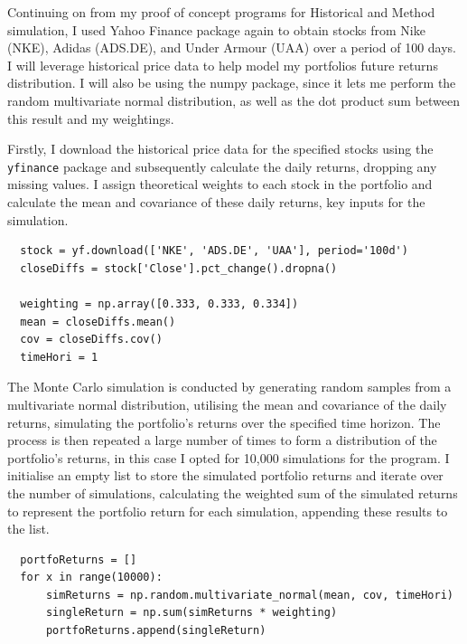 \documentclass{article}
\begin{document}
Continuing on from my proof of concept programs for Historical and Method simulation, I used Yahoo Finance package again to obtain stocks from Nike (NKE), Adidas (ADS.DE), and Under Armour (UAA) over a period of 100 days. I will leverage historical price data to help model my portfolios future returns distribution. I will also be using the numpy package, since it lets me perform the random multivariate normal distribution, as well as the dot product sum between this result and my weightings. \\\vspace{0.3cm}


Firstly, I download the historical price data for the specified stocks using the \texttt{yfinance} package and subsequently  calculate the daily returns, dropping any missing values. I assign theoretical weights to each stock in the portfolio and calculate the mean and covariance of these daily returns, key inputs for the simulation.\\\vspace{0.3cm}

\begin{verbatim}
  stock = yf.download(['NKE', 'ADS.DE', 'UAA'], period='100d')
  closeDiffs = stock['Close'].pct_change().dropna()

  weighting = np.array([0.333, 0.333, 0.334])
  mean = closeDiffs.mean()
  cov = closeDiffs.cov()
  timeHori = 1
\end{verbatim}

\vspace{0.3cm}
The Monte Carlo simulation is conducted by generating random samples from a multivariate normal distribution, utilising the mean and covariance of the daily returns, simulating the portfolio's returns over the specified time horizon. The process is then repeated a large number of times to form a distribution of the portfolio's returns, in this case I opted for 10,000 simulations for the program. I initialise an empty list to store the simulated portfolio returns and iterate over the number of simulations, calculating the weighted sum of the simulated returns to represent the portfolio return for each simulation, appending these results to the list.\\\vspace{0.3cm}

\begin{verbatim}
  portfoReturns = []
  for x in range(10000):
      simReturns = np.random.multivariate_normal(mean, cov, timeHori)
      singleReturn = np.sum(simReturns * weighting)
      portfoReturns.append(singleReturn)
\end{verbatim}
\end{document}
